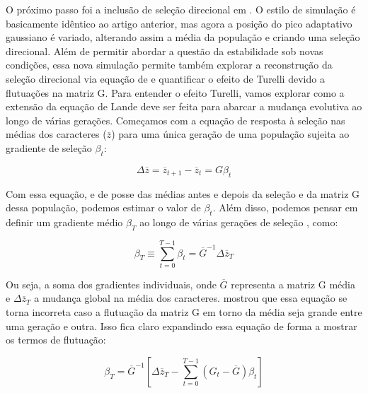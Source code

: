 O próximo passo foi a inclusão de seleção direcional em \cite{Jones2004}.
O estilo de simulação é basicamente idêntico ao artigo anterior, mas
agora a posição do pico adaptativo gaussiano é variado, alterando assim
a média da população e criando uma seleção direcional.
Além de permitir abordar a questão da estabilidade sob novas condições,
essa nova simulação permite também explorar a reconstrução da seleção
direcional via equação de \cite{Lande1979} e quantificar o efeito de
Turelli devido a flutuações na matriz G.
Para entender o efeito Turelli, vamos explorar como a extensão da
equação de Lande deve ser feita para abarcar a mudança evolutiva ao
longo de várias gerações.
Começamos com a equação de resposta à seleção nas médias dos caracteres
($\overline {z}$) para uma única geração de uma população sujeita ao
gradiente de seleção $\beta_t$:

\begin{equation}
\Delta \overline {z} = \overline {z}_{t+1}-\overline {z}_{t}=G\beta_t
\end{equation}

Com essa equação, e de posse das médias antes e depois da seleção e da
matriz G dessa população, podemos estimar o valor de $\beta_t$.
Além disso, podemos pensar em definir um gradiente médio $\beta_T$ ao
longo de várias gerações de seleção \citep{Lande1979}, como:

\begin{equation}
\beta_{T}\equiv \sum _{t=0}^{T-1} \beta_t =  \overline {G}^{-1}\Delta \overline {z}_T 
\label{betatotal}
\end{equation}

Ou seja, a soma dos gradientes individuais, onde $\overline {G}$
representa a matriz G média e $\Delta \overline {z}_T$ a mudança global
na média dos caracteres.
\cite{Turelli1988} mostrou que essa equação se torna incorreta caso a
flutuação da matriz G em torno da média seja grande entre uma geração e
outra.
Isso fica claro expandindo essa equação de forma a mostrar os termos de
flutuação:

\begin{equation}
   \beta_T = \overline {G}^{-1} \left[ \Delta \overline {z}_T - \sum_{t=0}^{T-1} (G_t - \overline {G}) \beta_t\right]
\end{equation}

